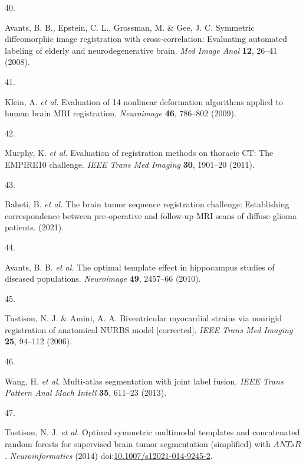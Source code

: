 \documentclass[
  12pt,
]{article}
\newlength{\cslhangindent}
\newlength{\csllabelwidth}
\newenvironment{CSLReferences}[2] %
 {%
  \setlength{\parindent}{0pt}
  \ifodd #1 \everypar{\setlength{\hangindent}{\cslhangindent}}\ignorespaces\fi
  \ifnum #2 > 0
  \setlength{\parskip}{#2\baselineskip}
  \fi
 }%
 {}
\newcommand{\CSLLeftMargin}[1]{\parbox[t]{\csllabelwidth}{#1}}
\newcommand{\CSLRightInline}[1]{\parbox[t]{\linewidth - \csllabelwidth}{#1}\break}
\begin{document}
\begin{CSLReferences}{0}{0}
\leavevmode{}%
\CSLLeftMargin{40. }
\CSLRightInline{Avants, B. B., Epstein, C. L., Grossman, M. \& Gee, J.
C. Symmetric diffeomorphic image registration with cross-correlation:
Evaluating automated labeling of elderly and neurodegenerative brain.
\emph{Med Image Anal} \textbf{12}, 26--41 (2008).}

\leavevmode{}%
\CSLLeftMargin{41. }
\CSLRightInline{Klein, A. \emph{et al.} Evaluation of 14 nonlinear
deformation algorithms applied to human brain {MRI} registration.
\emph{Neuroimage} \textbf{46}, 786--802 (2009).}

\leavevmode{}%
\CSLLeftMargin{42. }
\CSLRightInline{Murphy, K. \emph{et al.} Evaluation of registration
methods on thoracic {CT}: The {EMPIRE10} challenge. \emph{IEEE Trans Med
Imaging} \textbf{30}, 1901--20 (2011).}

\leavevmode{}%
\CSLLeftMargin{43. }
\CSLRightInline{Baheti, B. \emph{et al.} The brain tumor sequence
registration challenge: Establishing correspondence between
pre-operative and follow-up MRI scans of diffuse glioma patients.
(2021).}

\leavevmode{}%
\CSLLeftMargin{44. }
\CSLRightInline{Avants, B. B. \emph{et al.} The optimal template effect
in hippocampus studies of diseased populations. \emph{Neuroimage}
\textbf{49}, 2457--66 (2010).}

\leavevmode{}%
\CSLLeftMargin{45. }
\CSLRightInline{Tustison, N. J. \& Amini, A. A. Biventricular myocardial
strains via nonrigid registration of anatomical {NURBS} model
{[}corrected{]}. \emph{IEEE Trans Med Imaging} \textbf{25}, 94--112
(2006).}

\leavevmode{}%
\CSLLeftMargin{46. }
\CSLRightInline{Wang, H. \emph{et al.} Multi-atlas segmentation with
joint label fusion. \emph{IEEE Trans Pattern Anal Mach Intell}
\textbf{35}, 611--23 (2013).}

\leavevmode{}%
\CSLLeftMargin{47. }
\CSLRightInline{Tustison, N. J. \emph{et al.} Optimal symmetric
multimodal templates and concatenated random forests for supervised
brain tumor segmentation (simplified) with {\(ANTsR\)}.
\emph{Neuroinformatics} (2014)
doi:\href{https://doi.org/10.1007/s12021-014-9245-2}{10.1007/s12021-014-9245-2}.}


\end{CSLReferences}
\end{document}
